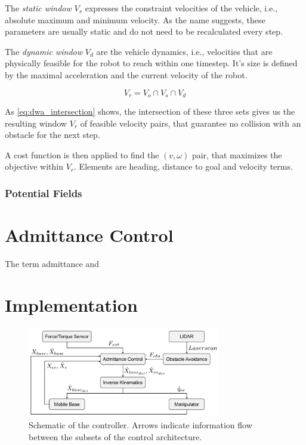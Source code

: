 The \emph{static window} $V_s$ expresses the constraint velocities of the vehicle, i.e., absolute maximum and minimum velocity. As the name suggests, these parameters are usually static and do not need to be recalculated every step.

The \emph{dynamic window} $V_d$ are the vehicle dynamics, i.e., velocities that are physically feasible for the robot to reach within one timestep. It's size is defined by the maximal acceleration and the current velocity of the robot.

\begin{equation}
V_r = V_o \cap V_s \cap V_d
 	\label{eq:dwa_intersection}
\end{equation}

As \cref{eq:dwa_intersection} shows, the intersection of these three sets gives us the resulting window $V_r$ of feasible velocity pairs, that guarantee no collision with an obstacle for the next step.

A cost function is then applied to find the $(v,\omega)$ pair, that maximizes the objective within $V_r$. Elements are heading, distance to goal and velocity terms.

\subsection{Potential Fields}
\chapter{Admittance Control}
The term admittance and 

\chapter{Implementation}
\begin{figure}
   \centering
   \includegraphics[width=0.75\textwidth]{images/controller_overview.jpg}
   \caption{Schematic of the controller. Arrows indicate information flow between the subsets of the control architecture.}
   \label{pics:controller_overview}
\end{figure}

